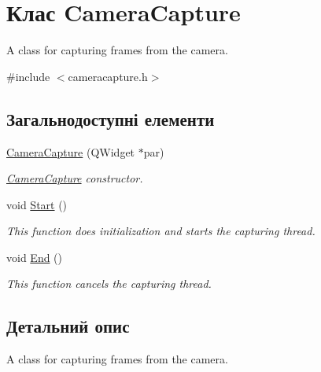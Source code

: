 \hypertarget{classCameraCapture}{\section{Клас Camera\-Capture}
\label{classCameraCapture}
}


A class for capturing frames from the camera.  




{\ttfamily \#include $<$cameracapture.\-h$>$}

\subsection*{Загальнодоступні елементи}
\begin{DoxyCompactItemize}
\item 
\hyperlink{classCameraCapture_a110d7f3ede7cb2e2b24584a9700abd2f}{Camera\-Capture} (Q\-Widget $\ast$par)
\begin{DoxyCompactList}\small\item\em \hyperlink{classCameraCapture}{Camera\-Capture} constructor. \end{DoxyCompactList}\item 
\hypertarget{classCameraCapture_a1ab7b68c620d79769afb3920320250fe}{void \hyperlink{classCameraCapture_a1ab7b68c620d79769afb3920320250fe}{Start} ()}\label{classCameraCapture_a1ab7b68c620d79769afb3920320250fe}

\begin{DoxyCompactList}\small\item\em This function does initialization and starts the capturing thread. \end{DoxyCompactList}\item 
\hypertarget{classCameraCapture_ab29bec18aca2752893b0dcd6b1870cc9}{void \hyperlink{classCameraCapture_ab29bec18aca2752893b0dcd6b1870cc9}{End} ()}\label{classCameraCapture_ab29bec18aca2752893b0dcd6b1870cc9}

\begin{DoxyCompactList}\small\item\em This function cancels the capturing thread. \end{DoxyCompactList}\end{DoxyCompactItemize}


\subsection{Детальний опис}
A class for capturing frames from the camera. 

